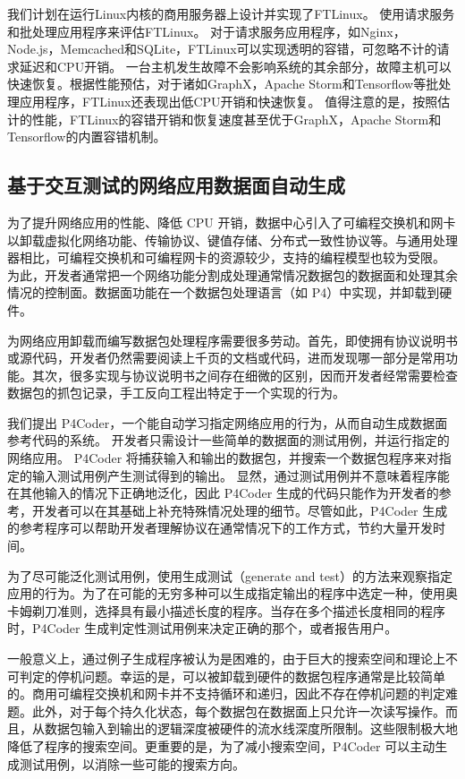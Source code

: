 我们计划在运行Linux内核的商用服务器上设计并实现了FTLinux。
使用请求服务和批处理应用程序来评估FTLinux。 对于请求服务应用程序，如Nginx，Node.js，Memcached和SQLite，FTLinux可以实现透明的容错，可忽略不计的请求延迟和CPU开销。 一台主机发生故障不会影响系统的其余部分，故障主机可以快速恢复。根据性能预估，对于诸如GraphX，Apache Storm和Tensorflow等批处理应用程序，FTLinux还表现出低CPU开销和快速恢复。 值得注意的是，按照估计的性能，FTLinux的容错开销和恢复速度甚至优于GraphX，Apache Storm和Tensorflow的内置容错机制。


\subsection{基于交互测试的网络应用数据面自动生成}

为了提升网络应用的性能、降低 CPU 开销，数据中心引入了可编程交换机和网卡以卸载虚拟化网络功能、传输协议、键值存储、分布式一致性协议等。与通用处理器相比，可编程交换机和可编程网卡的资源较少，支持的编程模型也较为受限。
为此，开发者通常把一个网络功能分割成处理通常情况数据包的数据面和处理其余情况的控制面。数据面功能在一个数据包处理语言（如 P4）中实现，并卸载到硬件。

为网络应用卸载而编写数据包处理程序需要很多劳动。首先，即使拥有协议说明书或源代码，开发者仍然需要阅读上千页的文档或代码，进而发现哪一部分是常用功能。其次，很多实现与协议说明书之间存在细微的区别，因而开发者经常需要检查数据包的抓包记录，手工反向工程出特定于一个实现的行为。

我们提出 P4Coder，一个能自动学习指定网络应用的行为，从而自动生成数据面参考代码的系统。
开发者只需设计一些简单的数据面的测试用例，并运行指定的网络应用。
P4Coder 将捕获输入和输出的数据包，并搜索一个数据包程序来对指定的输入测试用例产生测试得到的输出。
显然，通过测试用例并不意味着程序能在其他输入的情况下正确地泛化，因此 P4Coder 生成的代码只能作为开发者的参考，开发者可以在其基础上补充特殊情况处理的细节。尽管如此，P4Coder 生成的参考程序可以帮助开发者理解协议在通常情况下的工作方式，节约大量开发时间。

为了尽可能泛化测试用例，使用生成测试（generate and test）的方法来观察指定应用的行为。为了在可能的无穷多种可以生成指定输出的程序中选定一种，使用奥卡姆剃刀准则，选择具有最小描述长度的程序。当存在多个描述长度相同的程序时，P4Coder 生成判定性测试用例来决定正确的那个，或者报告用户。

一般意义上，通过例子生成程序被认为是困难的，由于巨大的搜索空间和理论上不可判定的停机问题。幸运的是，可以被卸载到硬件的数据包程序通常是比较简单的。商用可编程交换机和网卡并不支持循环和递归，因此不存在停机问题的判定难题。此外，对于每个持久化状态，每个数据包在数据面上只允许一次读写操作。而且，从数据包输入到输出的逻辑深度被硬件的流水线深度所限制。这些限制极大地降低了程序的搜索空间。更重要的是，为了减小搜索空间，P4Coder 可以主动生成测试用例，以消除一些可能的搜索方向。

